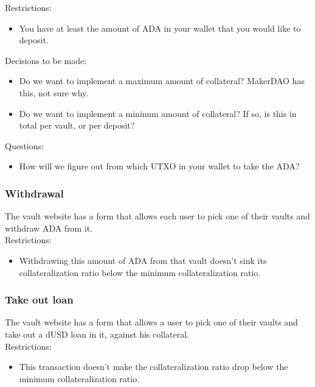 \documentclass{article} %
\begin{document}
Restrictions:
\begin{itemize}
  \item You have at least the amount of ADA in your wallet that you would like
    to deposit.
\end{itemize}

Decisions to be made:
\begin{itemize}
  \item Do we want to implement a maximum amount of collateral? MakerDAO has
    this, not sure why.
  \item Do we want to implement a mininum amount of collateral? If so, is this
    in total per vault, or per deposit?
\end{itemize}

Questions:
\begin{itemize}
  \item How will we figure out from which UTXO in your wallet to take the ADA?
\end{itemize}

\subsubsection{Withdrawal}

The vault website has a form that allows each user to pick one of their vaults
and withdraw ADA from it. \\

Restrictions:
\begin{itemize}
  \item Withdrawing this amount of ADA from that vault doesn't sink its
    collateralization ratio below the minimum collateralization ratio.
\end{itemize}

\subsubsection{Take out loan}

The vault website has a form that allows a user to pick one of their vaults and
take out a dUSD loan in it, against his collateral. \\

Restrictions:
\begin{itemize}
  \item This transaction doesn't make the collateralization ratio drop below the
    minimum collateralization ratio.
\end{itemize}

\end{document}
